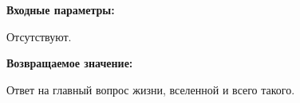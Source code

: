 \textbf{Входные параметры:}  
 
Отсутствуют.

\textbf{Возвращаемое значение:}

Ответ на главный вопрос жизни, вселенной и всего такого.